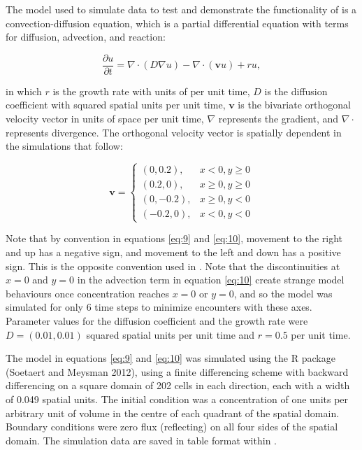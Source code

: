 The model used to simulate data to test and demonstrate the functionality of  is a convection-diffusion equation, which is a partial differential equation with terms for diffusion, advection, and reaction:

\begin{equation}
\frac{\partial u}{\partial t} = \nabla \cdot \left(D \nabla u \right) - \nabla \cdot \left( \mathbf{v} u \right) + r u, 
\label{eq:9}
\end{equation}

\noindent in which \(r\) is the growth rate with units of per unit time, \(D\) is the diffusion coefficient with squared spatial units per unit time, \(\mathbf{v}\) is the bivariate orthogonal velocity vector in units of space per unit time, \(\nabla\) represents the gradient, and \(\nabla \cdot\) represents divergence. The orthogonal velocity vector is spatially dependent in the simulations that follow:

\begin{equation}
\mathbf{v} = \begin{cases} \label{eq:10}
            (0, 0.2), & x < 0, y \geq 0\\
      (0.2, 0), & x \geq 0, y \geq 0\\
      (0, -0.2), & x \geq 0, y < 0\\
      (-0.2, 0), & x < 0, y < 0
         \end{cases}
\end{equation}

\noindent Note that by convention in equations \eqref{eq:9} and \eqref{eq:10}, movement to the right and up has a negative sign, and movement to the left and down has a positive sign. This is the opposite convention used in . Note that the discontinuities at \(x = 0\) and \(y = 0\) in the advection term in equation \eqref{eq:10} create strange model behaviours once concentration reaches \(x = 0\) or \(y = 0\), and so the model was simulated for only 6 time steps to minimize encounters with these axes. Parameter values for the diffusion coefficient and the growth rate were \(D = (0.01, 0.01)\) squared spatial units per unit time and \(r = 0.5\) per unit time.

The model in equations \eqref{eq:9} and \eqref{eq:10} was simulated using the  R package (Soetaert and Meysman 2012), using a finite differencing scheme with backward differencing on a square domain of 202 cells in each direction, each with a width of 0.049 spatial units. The initial condition was a concentration of one units per arbitrary unit of volume in the centre of each quadrant of the spatial domain. Boundary conditions were zero flux (reflecting) on all four sides of the spatial domain. The simulation data are saved in table format within .

